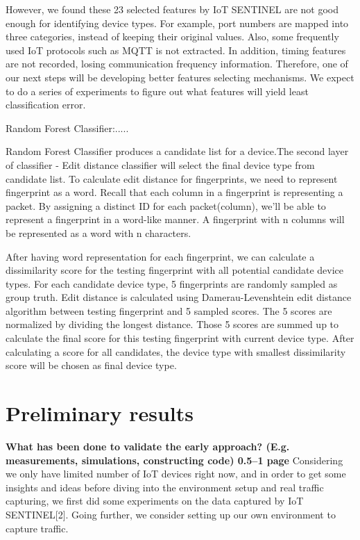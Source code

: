 \documentclass[twocolumn,10pt]{article}
\begin{document}
However, we found these 23 selected features by IoT SENTINEL are not good enough for identifying device types. For example, port numbers are mapped into three categories, instead of keeping their original values. Also, some frequently used IoT protocols such as MQTT is not extracted. In addition, timing features are not recorded, losing communication frequency information. Therefore, one of our next steps will be developing better features selecting mechanisms. We expect to do a series of experiments to figure out what features will yield least classification error.

Random Forest Classifier:.....

Random Forest Classifier produces a candidate list for a device.The second layer of classifier - Edit distance classifier will select the final device type from candidate list. To calculate edit distance for fingerprints, we need to represent fingerprint as a word. Recall that each column in a fingerprint is representing a packet. By assigning a distinct ID for each packet(column), we’ll be able to represent a fingerprint in a word-like manner. A fingerprint with n columns will be represented as a word with n characters.

After having word representation for each fingerprint, we can calculate a dissimilarity score for the testing fingerprint with all potential candidate device types. For each candidate device type, 5 fingerprints are randomly sampled as group truth. Edit distance is calculated using Damerau-Levenshtein edit distance algorithm between testing fingerprint and 5 sampled scores. The 5 scores are normalized by dividing the longest distance. Those 5 scores are summed up to calculate the final score for this testing fingerprint with current device type. After calculating a score for all candidates, the device type with smallest dissimilarity score will be chosen as final device type.

\section{Preliminary results}

{\bf What has been done to validate the early approach? (E.g.
measurements, simulations, constructing code)  0.5--1 page}
Considering we only have limited number of IoT devices right now, and in order to get some insights and ideas before diving into the environment setup and real traffic capturing, we first did some experiments on the data captured by IoT SENTINEL[2]. Going further, we consider setting up our own environment to capture traffic. 
\end{document}
